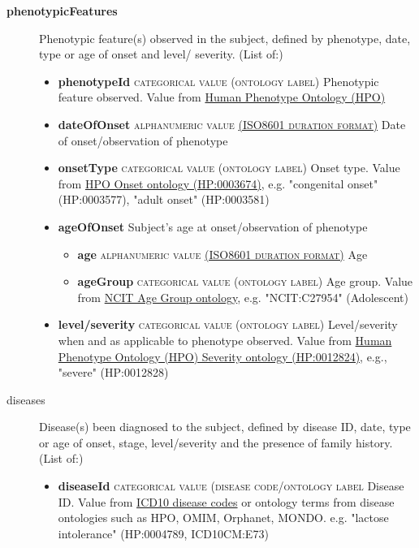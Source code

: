\documentclass[a4paper, 10pt]{article}        %
\begin{document}
\begin{description}
	\item[\textbf{phenotypicFeatures}] Phenotypic feature(s) observed in the subject, defined by phenotype, date, type or age of onset and level/ severity. (List of:)
	\begin{itemize}
			\item[] \textbf{phenotypeId} {\textsc{categorical value (ontology label)}} Phenotypic feature observed. Value from \href{http:purl.obolibrary.org/obo/HP_0000001}{Human Phenotype Ontology (HPO)} 
			\item[] \textbf{dateOfOnset} {\textsc{alphanumeric value \href{https://www.iso.org/iso-8601-date-and-time-format.html}{(ISO8601 duration format)}}} Date of onset/observation of phenotype   
			\item[] \textbf{onsetType} {\textsc{categorical value (ontology label)}}
 Onset type. Value from \href{http://purl.obolibrary.org/obo/HP_0003674}{HPO Onset ontology (HP:0003674)}, e.g. "congenital onset" (HP:0003577), "adult onset" (HP:0003581)
  			\item[] \textbf{ageOfOnset} Subject's age at onset/observation of phenotype
			\begin{itemize}
 			\item[] \textbf{age} {\textsc{alphanumeric value \href{https://www.iso.org/iso-8601-date-and-time-format.html}{(ISO8601 duration format)}}} Age  
			\item[] \textbf{ageGroup} {\textsc{categorical value (ontology label)}} Age group. Value from \href{https://www.ebi.ac.uk/ols/ontologies/ncit/terms?iri=http%3A%2F%2Fpurl.obolibrary.org%2Fobo%2FNCIT_C20587}{NCIT Age Group ontology}, e.g. "NCIT:C27954" (Adolescent)
			\end{itemize}
			\item[] \textbf{level/severity}  {\textsc{categorical value (ontology label)}} Level/severity when and as applicable to phenotype observed. Value from \href{http://purl.obolibrary.org/obo/HP_0012824}{Human Phenotype Ontology (HPO) Severity ontology (HP:0012824)}, e.g., "severe" (HP:0012828)
	\end{itemize}
	\item[diseases] Disease(s) been diagnosed to the subject, defined by disease ID, date, type or age of onset, stage, level/severity and the presence of family history. (List of:)
	\begin{itemize}
			\item[]  \textbf{diseaseId} {\textsc{categorical value (disease code/ontology label}} Disease ID. Value from \href{https://www.who.int/classifications/icd/en/}{ICD10 disease codes} or ontology terms from disease ontologies such as HPO, OMIM, Orphanet, MONDO. e.g. "lactose intolerance" (HP:0004789, ICD10CM:E73)

\end{itemize}
\end{description}
\end{document}
